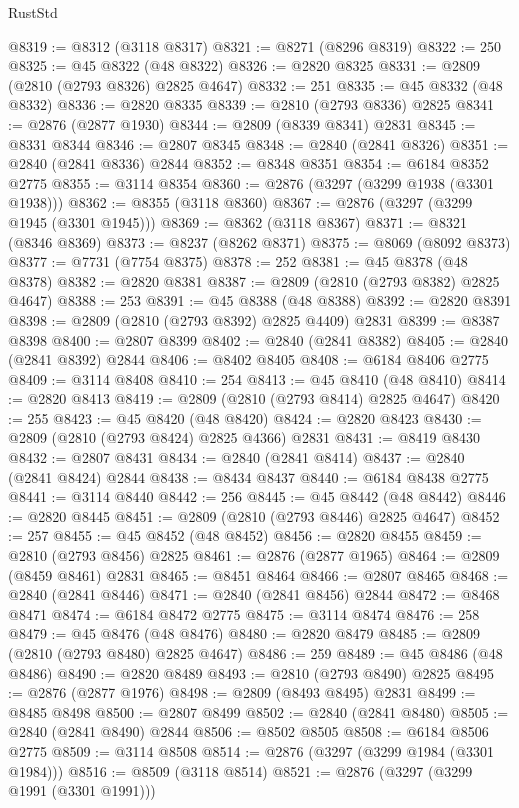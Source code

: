 \begin{lexlean}{RustStd}
\begin{coremodule}
{\begin{coremodule}
{{{{{{{{{{{{{{{{{{{{{{{{{{{{{{{{{@8319 := @8312 (@3118 @8317)
@8321 := @8271 (@8296 @8319)
@8322 := 250
@8325 := @45 @8322 (@48 @8322)
@8326 := @2820 @8325
@8331 := @2809 (@2810 (@2793 @8326) @2825 @4647)
@8332 := 251
@8335 := @45 @8332 (@48 @8332)
@8336 := @2820 @8335
@8339 := @2810 (@2793 @8336) @2825
@8341 := @2876 (@2877 @1930)
@8344 := @2809 (@8339 @8341) @2831
@8345 := @8331 @8344
@8346 := @2807 @8345
@8348 := @2840 (@2841 @8326)
@8351 := @2840 (@2841 @8336) @2844
@8352 := @8348 @8351
@8354 := @6184 @8352 @2775
@8355 := @3114 @8354
@8360 := @2876 (@3297 (@3299 @1938 (@3301 @1938)))
@8362 := @8355 (@3118 @8360)
@8367 := @2876 (@3297 (@3299 @1945 (@3301 @1945)))
@8369 := @8362 (@3118 @8367)
@8371 := @8321 (@8346 @8369)
@8373 := @8237 (@8262 @8371)
@8375 := @8069 (@8092 @8373)
@8377 := @7731 (@7754 @8375)
@8378 := 252
@8381 := @45 @8378 (@48 @8378)
@8382 := @2820 @8381
@8387 := @2809 (@2810 (@2793 @8382) @2825 @4647)
@8388 := 253
@8391 := @45 @8388 (@48 @8388)
@8392 := @2820 @8391
@8398 := @2809 (@2810 (@2793 @8392) @2825 @4409) @2831
@8399 := @8387 @8398
@8400 := @2807 @8399
@8402 := @2840 (@2841 @8382)
@8405 := @2840 (@2841 @8392) @2844
@8406 := @8402 @8405
@8408 := @6184 @8406 @2775
@8409 := @3114 @8408
@8410 := 254
@8413 := @45 @8410 (@48 @8410)
@8414 := @2820 @8413
@8419 := @2809 (@2810 (@2793 @8414) @2825 @4647)
@8420 := 255
@8423 := @45 @8420 (@48 @8420)
@8424 := @2820 @8423
@8430 := @2809 (@2810 (@2793 @8424) @2825 @4366) @2831
@8431 := @8419 @8430
@8432 := @2807 @8431
@8434 := @2840 (@2841 @8414)
@8437 := @2840 (@2841 @8424) @2844
@8438 := @8434 @8437
@8440 := @6184 @8438 @2775
@8441 := @3114 @8440
@8442 := 256
@8445 := @45 @8442 (@48 @8442)
@8446 := @2820 @8445
@8451 := @2809 (@2810 (@2793 @8446) @2825 @4647)
@8452 := 257
@8455 := @45 @8452 (@48 @8452)
@8456 := @2820 @8455
@8459 := @2810 (@2793 @8456) @2825
@8461 := @2876 (@2877 @1965)
@8464 := @2809 (@8459 @8461) @2831
@8465 := @8451 @8464
@8466 := @2807 @8465
@8468 := @2840 (@2841 @8446)
@8471 := @2840 (@2841 @8456) @2844
@8472 := @8468 @8471
@8474 := @6184 @8472 @2775
@8475 := @3114 @8474
@8476 := 258
@8479 := @45 @8476 (@48 @8476)
@8480 := @2820 @8479
@8485 := @2809 (@2810 (@2793 @8480) @2825 @4647)
@8486 := 259
@8489 := @45 @8486 (@48 @8486)
@8490 := @2820 @8489
@8493 := @2810 (@2793 @8490) @2825
@8495 := @2876 (@2877 @1976)
@8498 := @2809 (@8493 @8495) @2831
@8499 := @8485 @8498
@8500 := @2807 @8499
@8502 := @2840 (@2841 @8480)
@8505 := @2840 (@2841 @8490) @2844
@8506 := @8502 @8505
@8508 := @6184 @8506 @2775
@8509 := @3114 @8508
@8514 := @2876 (@3297 (@3299 @1984 (@3301 @1984)))
@8516 := @8509 (@3118 @8514)
@8521 := @2876 (@3297 (@3299 @1991 (@3301 @1991)))
}}}}}}}}}}}}}}}}}}}}}}}}}}}}}}}}}
\end{coremodule}}
\end{coremodule}
\end{lexlean}
